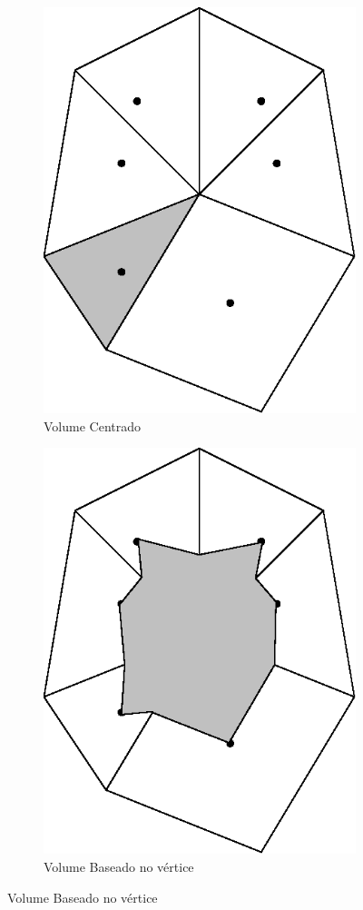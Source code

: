 \begin{figure}[ht]
    \begin{subfigure}{.5\textwidth}
        \centering
        \includegraphics[width=.8\linewidth]{fig/volume_centrado.eps}
        \caption{Volume Centrado}
        \label{fig:volume_centrado}        
    \end{subfigure}
    \begin{subfigure}{.5\textwidth}
        \centering
        \includegraphics[width=.8\linewidth]{fig/volume_vertice.eps}
        \caption[]{Volume Baseado no vértice}
        \label{fig:volume_vertice}        
    \end{subfigure}


\end{figure}
